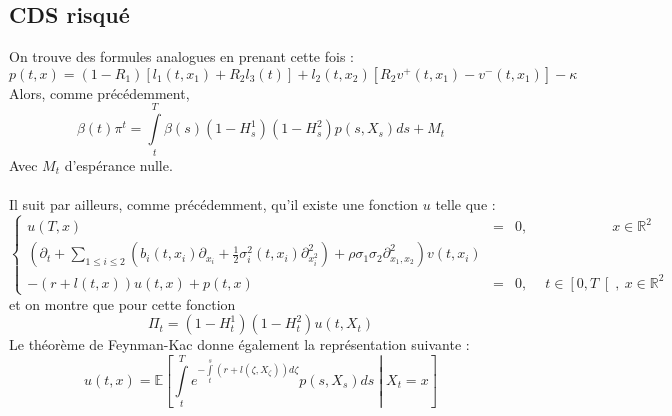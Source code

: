 \documentclass[a4paper]{article}
\theoremstyle{definition}
\theoremstyle{remark}
\begin{document}
\subsection{CDS risqué}
On trouve des formules analogues en prenant cette fois :
\begin{equation*}
p(t,x) = (1-R_1)\left[l_1(t,x_1) + R_2 l_3 (t) \right] + l_2 (t,x_2) \left[R_2 v^+ (t,x_1) - v^-(t,x_1)\right] - \kappa
\end{equation*}
Alors, comme précédemment,
\begin{equation*}
\beta(t)\pi^t = \int \limits_t^T \beta(s) (1-H_s^1) (1-H_s^2) p(s,X_s) ds + M_t
\end{equation*}
Avec $M_t$ d'espérance nulle.\\ \\
Il suit par ailleurs, comme précédemment, qu'il existe une fonction $u$ telle que :
\begin{equation}
\left\{
\begin{split}
u(T, x) &=& 0,\qquad \qquad \qquad x \in \mathbb{R}^2 \\
\left(\partial_t +\sum \limits_{1 \leq i \leq 2} ( b_i(t,x_i)\partial_{x_i} + \frac{1}{2}\sigma_i^2(t,x_i)\partial^2_{x^2_i}) + \rho \sigma_1 \sigma_2 \partial^2_{x_1,x_2}\right)v(t,x_i) \\
- (r+l(t,x))u(t,x) + p(t,x) &=& 0,\quad \ t\in\left[0,T\right[,\ x \in \mathbb{R}^2
\end{split}
\right.
\end{equation}
et on montre que pour cette fonction
\begin{equation*}
\Pi_t = (1 - H^1_t)(1-H^2_t)u(t,X_t)
\end{equation*}
Le théorème de Feynman-Kac donne également la représentation suivante :
\begin{equation}
u(t,x) = \mathbb{E}\left[\int \limits_t^T e^{-\int \limits_t^s (r + l(\zeta, X_\zeta))d\zeta} p (s, X_s) ds \middle| X_t = x \right]
\end{equation}
~~\\\\
\end{document}
